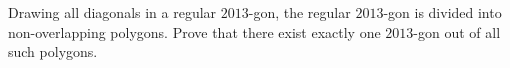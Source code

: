 Drawing all diagonals in a regular $2013$-gon, the regular $2013$-gon is divided into non-overlapping polygons.
Prove that there exist exactly one $2013$-gon out of all such polygons.